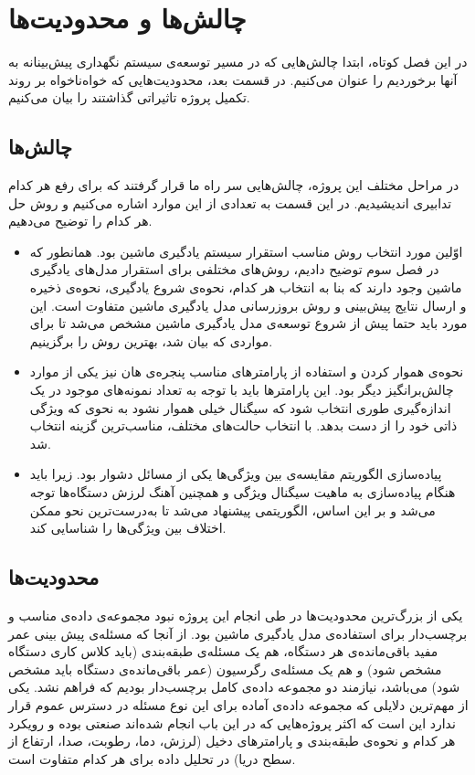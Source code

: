 \chapter{چالش‌ها و محدودیت‌ها}
در این فصل کوتاه، ابتدا چالش‌هایی که در مسیر توسعه‌ی سیستم نگهداری پیش‌بینانه به آنها برخوردیم را عنوان می‌کنیم. در قسمت بعد، محدودیت‌هایی که خواه‌‌نا‌خواه بر روند تکمیل پروژه تاثیراتی گذاشتند را بیان می‌کنیم.

\section{چالش‌ها}
در مراحل مختلف این پروژه، چالش‌هایی سر راه ما قرار گرفتند که برای رفع هر کدام تدابیری اندیشیدیم. در این قسمت به تعدادی از این موارد اشاره می‌کنیم و روش حل هر کدام را توضیح می‌دهیم. 

\begin{itemize}

\item اوّلین مورد انتخاب روش مناسب استقرار سیستم یادگیری ماشین بود. همانطور که در فصل سوم توضیح دادیم، روش‌های مختلفی برای استقرار مدل‌های یادگیری ماشین وجود دارند که بنا به انتخاب هر کدام، نحوه‌ی شروع یادگیری، نحوه‌ی ذخیره‌ و ارسال نتایج پیش‌بینی و روش بروزرسانی مدل یادگیری ماشین متفاوت است. این مورد باید حتما پیش از شروع توسعه‌ی مدل یادگیری ماشین مشخص می‌شد تا برای مواردی که بیان شد، بهترین روش را برگزینیم.

\item نحوه‌ی هموار کردن و استفاده از پارامترهای مناسب پنجره‌ی هان نیز یکی از موارد چالش‌برانگیز دیگر بود. این پارامترها باید با توجه به تعداد نمونه‌های موجود در یک اندازه‌گیری طوری  انتخاب شود که سیگنال خیلی هموار نشود به نحوی که ویژگی ذاتی خود را از دست بدهد. با انتخاب حالت‌های مختلف، مناسب‌ترین گزینه انتخاب شد.

\item پیاده‌سازی الگوریتم مقایسه‌ی بین ویژگی‌ها یکی از مسائل دشوار بود. زیرا باید هنگام پیاده‌سازی به ماهیت سیگنال ویژگی  و همچنین آهنگ لرزش دستگا‌ه‌ها توجه می‌شد و بر این اساس، الگوریتمی پیشنهاد می‌شد تا به‌درست‌ترین نحو ممکن اختلاف بین ویژگی‌ها را شناسایی کند. 

\end{itemize}


\section{محدودیت‌ها}
یکی از بزرگ‌ترین محدودیت‌ها در طی انجام این پروژه نبود مجموعه‌ی داده‌‌ی مناسب و برچسب‌دار برای استفاده‌ی مدل یادگیری ماشین بود. از آنجا که مسئله‌ی پیش بینی عمر مفید باقی‌مانده‌ی هر دستگاه، هم یک مسئله‌ی طبقه‌بندی (باید کلاس کاری دستگاه مشخص شود) و هم یک مسئله‌ی رگرسیون (عمر باقی‌مانده‌ی دستگاه باید مشخص شود) می‌باشد، نیازمند دو مجموعه داده‌ی کامل برچسب‌دار بودیم که فراهم نشد. یکی از مهم‌ترین دلایلی که مجموعه داده‌ی آماده برای این نوع مسئله در دسترس عموم قرار ندارد این است که اکثر پروژه‌هایی که در این باب انجام شده‌اند صنعتی بوده و رویکرد هر کدام و نحوه‌ی طبقه‌بندی و پارامترهای دخیل (لرزش، دما، رطوبت، صدا، ارتفاع از سطح دریا) در تحلیل داده برای هر کدام متفاوت است.